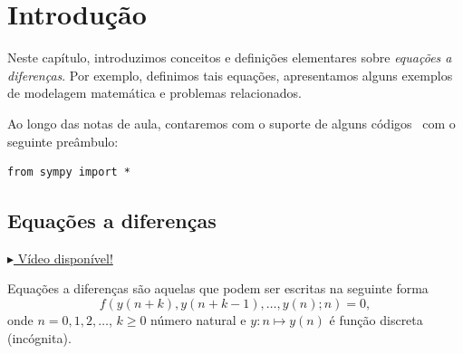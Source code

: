 
\chapter{Introdução}\label{cap_intro}

Neste capítulo, introduzimos conceitos e definições elementares sobre \emph{equações a diferenças}. Por exemplo, definimos tais equações, apresentamos alguns exemplos de modelagem matemática e problemas relacionados.

\ifispython
\begin{obs}\label{obs:python}
Ao longo das notas de aula, contaremos com o suporte de alguns códigos \python\, com o seguinte preâmbulo:
\begin{verbatim}
from sympy import *
\end{verbatim}
\end{obs}
\fi


\section{Equações a diferenças}\label{cap_intro_sec_ead}

\begin{flushright}
  \href{https://archive.org/details/ead-intro}{$\blacktriangleright$ Vídeo disponível!}
\end{flushright}

Equações a diferenças são aquelas que podem ser escritas na seguinte forma
\begin{equation}\label{eq:intro_ead}
  f\left(y(n+k),y(n+k-1),\dotsc,y(n);n\right) = 0,
\end{equation}
onde $n=0, 1, 2, \ldots$, $k\geq 0$ número natural e $y:n\mapsto y(n)$ é função discreta (incógnita).

